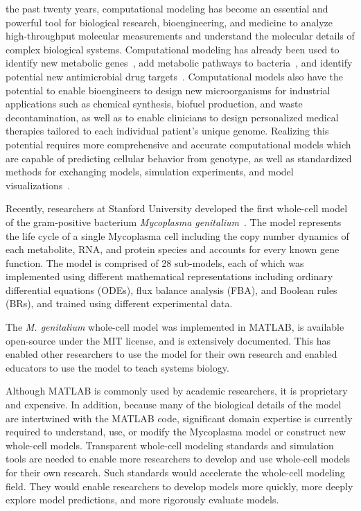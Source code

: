 \documentclass[journal,transmag]{IEEEtran}
\begin{document}
 the past twenty years, computational modeling has become an essential and powerful tool for biological research, bioengineering, and medicine to analyze high-throughput molecular measurements and understand the molecular details of complex biological systems. 
Computational modeling has already been used to identify new metabolic genes~\cite{Reed2006}, add metabolic pathways to bacteria~\cite{Lee2009}, and identify potential new antimicrobial drug targets~\cite{Lee2012}. 
Computational models also have the potential to enable bioengineers to design new microorganisms for industrial applications such as chemical synthesis, biofuel production, and waste decontamination, as well as to enable clinicians to design personalized medical therapies tailored to each individual patient's unique genome. 
Realizing this potential requires more comprehensive and accurate computational models which are capable of predicting cellular behavior from genotype, as well as standardized methods for exchanging models, simulation experiments, and model visualizations~\cite{Macklin2014,Karr2015,Klipp07}.

Recently, researchers at Stanford University developed the first whole-cell model of the gram-positive bacterium \textit{Mycoplasma genitalium}~\cite{Karr2012}. 
The model represents the life cycle of a single Mycoplasma cell including the copy number dynamics of each metabolite, RNA, and protein species and accounts for every known gene function. 
The model is comprised of 28 sub-models, each of which was implemented using different mathematical representations including ordinary differential equations (ODEs), flux balance analysis (FBA), and Boolean rules (BRs), and trained using different experimental data. 

The \textit{M. genitalium} whole-cell model was implemented in MATLAB, is available open-source under the MIT license, and is extensively documented. 
This has enabled other researchers to use the model for their own research and enabled educators to use the model to teach systems biology. 

Although MATLAB is commonly used by academic researchers, it is proprietary and expensive. In addition, because many of the biological details of the model are intertwined with the MATLAB code, significant domain expertise is currently required to understand, use, or modify the Mycoplasma model or construct new whole-cell models. 
Transparent whole-cell modeling standards and simulation tools are needed to enable more researchers to develop and use whole-cell models for their own research. 
Such standards would accelerate the whole-cell modeling field. They would enable researchers to develop models more quickly, more deeply explore model predictions, and more rigorously evaluate models. 
\end{document}
